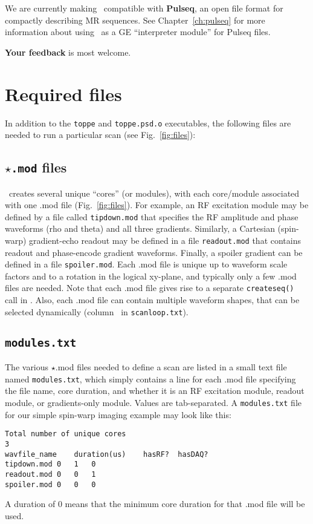 We are currently making \toppe~compatible with {\bf Pulseq}, an open file format for compactly describing MR sequences.
See Chapter~\ref{ch:pulseq} for more information about using \toppe~as a GE ``interpreter module'' for Pulseq files.

\textbf{Your feedback} is most welcome. 


\section{Required files}
In addition to the {\tt toppe} and {\tt toppe.psd.o} executables, the following files are needed to run a particular scan (see Fig.~\ref{fig:files}):

\subsection{ {\tt $\star$.mod} files}
\toppe~creates several unique ``cores'' (or modules), with each core/module associated with one .mod file (Fig.~\ref{fig:files}).
For example, an RF excitation module may be defined by a file called {\tt tipdown.mod} that specifies the RF amplitude and phase waveforms (rho and theta) and all three gradients.
Similarly, a Cartesian (spin-warp) gradient-echo readout may be defined in a file {\tt readout.mod} that contains readout and phase-encode gradient waveforms.
Finally, a spoiler gradient can be defined in a file {\tt spoiler.mod}.
Each .mod file is unique up to waveform scale factors and to a rotation in the logical xy-plane, and typically only a few .mod files are needed.
Note that each .mod file gives rise to a separate {\tt createseq()} call in \toppe.
Also, each .mod file can contain multiple waveform shapes, that can be selected dynamically (column \waveformnum~in {\tt scanloop.txt}).

\subsection{\tt modules.txt}
The various $\star$.mod files needed to define a scan are listed in a small text file named {\tt modules.txt}, which simply contains a line for each .mod file specifying the file name, core duration, and whether it is an RF excitation module, readout module, or gradients-only module.
Values are tab-separated.
A {\tt modules.txt} file for our simple spin-warp imaging example may look like this:
\begin{lstlisting}
Total number of unique cores
3
wavfile_name	duration(us)	hasRF?	hasDAQ?
tipdown.mod	0	1	0
readout.mod	0	0	1
spoiler.mod	0	0	0
\end{lstlisting}
A duration of 0 means that the minimum core duration for that .mod file will be used.

